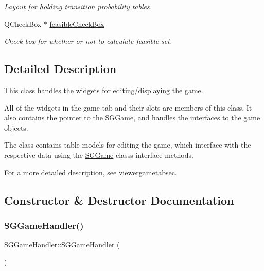 \begin{DoxyCompactItemize}
\begin{DoxyCompactList}\small\item\em Layout for holding transition probability tables. \end{DoxyCompactList}\item 
\mbox{\label{classSGGameHandler_a6ec21010dfb89d193762bf8c8d443394}} 
Q\+Check\+Box $\ast$ \hyperlink{classSGGameHandler_a6ec21010dfb89d193762bf8c8d443394}{feasible\+Check\+Box}
\begin{DoxyCompactList}\small\item\em Check box for whether or not to calculate feasible set. \end{DoxyCompactList}\end{DoxyCompactItemize}


\subsection{Detailed Description}
This class handles the widgets for editing/displaying the game. 

All of the widgets in the game tab and their slots are members of this class. It also contains the pointer to the \hyperlink{classSGGame}{S\+G\+Game}, and handles the interfaces to the game objects.

The class contains table models for editing the game, which interface with the respective data using the \hyperlink{classSGGame}{S\+G\+Game} class\textquotesingle{}s interface methods.

For a more detailed description, see viewergametabsec. 

\subsection{Constructor \& Destructor Documentation}
\mbox{\label{classSGGameHandler_a2fe607ec68529ca4200cacf2e29725f9}} 
\subsubsection{\texorpdfstring{S\+G\+Game\+Handler()}{SGGameHandler()}}
{\footnotesize\ttfamily S\+G\+Game\+Handler\+::\+S\+G\+Game\+Handler (\begin{DoxyParamCaption}{ }\end{DoxyParamCaption})}



